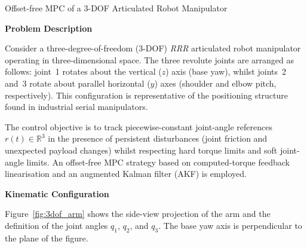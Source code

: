 
\begin{examplebox}{Offset-free MPC of a 3-DOF Articulated Robot Manipulator}
	
	\textbf{\textsf{Problem Description}}
	
	Consider a three-degree-of-freedom (3-DOF) \emph{RRR} articulated robot manipulator
	operating in three-dimensional space. The three revolute joints are arranged as follows:
	joint~1 rotates about the vertical ($z$) axis (base yaw), whilst joints~2 and~3 rotate
	about parallel horizontal ($y$) axes (shoulder and elbow pitch, respectively). This
	configuration is representative of the positioning structure found in industrial serial
	manipulators.
	
	The control objective is to track piecewise-constant joint-angle references
	$r(t) \in \mathbb{R}^{3}$ in the presence of persistent disturbances (joint friction
	and unexpected payload changes) whilst respecting hard torque limits and soft joint-angle
	limits. An offset-free MPC strategy based on computed-torque feedback linearisation and
	an augmented Kalman filter (AKF) is employed.
	
	\vspace{0.5em}
	\textbf{\textsf{Kinematic Configuration}}
	
	Figure~\ref{fig:3dof_arm} shows the side-view projection of the arm and the
	definition of the joint angles $q_1$, $q_2$, and $q_3$. The base yaw axis
	is perpendicular to the plane of the figure.
	
	\begin{figure}[H]
		\centering
		\begin{tikzpicture}[
			every node/.style={font=\small\sffamily},
			joint/.style={circle, draw=excolor, fill=exback, thick, minimum size=7pt, inner sep=0pt},
			link/.style={draw=black!70, line width=2.5pt, line cap=round},
			ground/.style={pattern=north east lines, pattern color=black!40, draw=black!60}
			]
			

\end{tikzpicture}
\end{figure}
\end{examplebox}

